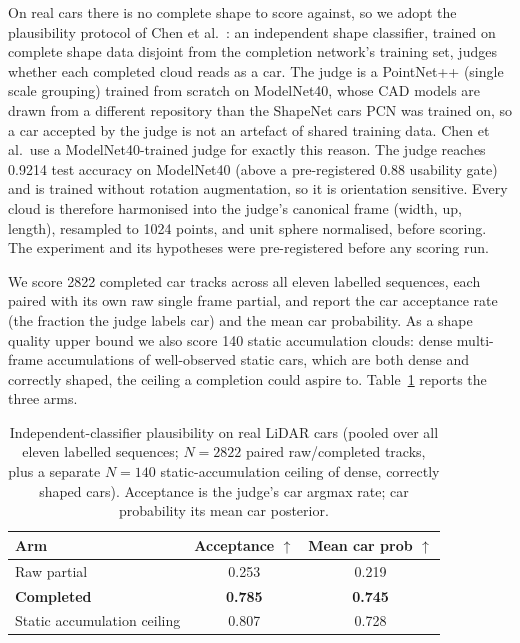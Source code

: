 \documentclass[a4paper,12pt]{report}
\begin{document}
On real cars there is no complete shape to score against, so we adopt the plausibility
protocol of Chen et al.~\cite{chen2020unpaired}: an independent shape classifier,
trained on complete shape data disjoint from the completion network's training set, judges
whether each completed cloud reads as a car. The judge is a PointNet++ (single scale
grouping) trained from scratch on ModelNet40, whose CAD models are drawn from a different
repository than the ShapeNet cars PCN was trained on, so a car accepted by the judge is not
an artefact of shared training data. Chen et al.\ use a ModelNet40-trained judge for exactly
this reason. The judge reaches \num{0.9214} test accuracy on ModelNet40 (above a
pre-registered \num{0.88} usability gate) and is trained without rotation augmentation, so
it is orientation sensitive. Every cloud is therefore harmonised into the judge's canonical
frame (width, up, length), resampled to \num{1024} points, and unit sphere normalised, before
scoring. The experiment and its hypotheses were pre-registered before any scoring run.

We score \num{2822} completed car tracks across all eleven labelled sequences, each paired
with its own raw single frame partial, and report the car acceptance rate (the fraction the
judge labels car) and the mean car probability. As a shape quality upper bound we also score
\num{140} static accumulation clouds: dense multi-frame accumulations of well-observed
static cars, which are both dense and correctly shaped, the ceiling a completion could aspire
to. Table~\ref{tab:plausibility} reports the three arms.

\begin{table}[H]
  \centering
  \caption[Independent classifier plausibility of completed cars]{Independent-classifier
    plausibility on real LiDAR cars (pooled over all eleven labelled sequences;
    $N=\num{2822}$ paired raw/completed tracks, plus a separate $N=\num{140}$
    static-accumulation ceiling of dense, correctly shaped cars). Acceptance is the judge's
    car argmax rate; car probability its mean car posterior.}
  \label{tab:plausibility}
  \begin{tabular}{lcc}
    \toprule
    Arm & Acceptance $\uparrow$ & Mean car prob $\uparrow$ \\
    \midrule
    Raw partial            & 0.253          & 0.219 \\
    \textbf{Completed}     & \textbf{0.785} & \textbf{0.745} \\
    Static accumulation ceiling & 0.807     & 0.728 \\
    \bottomrule
  \end{tabular}
\end{table}
\end{document}
